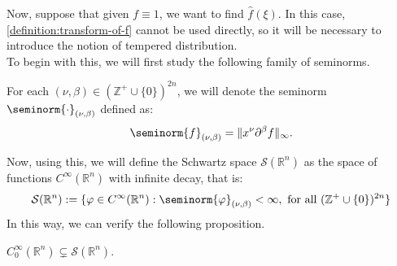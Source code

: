 Now, suppose that given $f \equiv 1$, we want to find $\hat{f}(\xi)$. In this case, \cref{definition:transform-of-f} cannot be used directly, so it will be necessary to introduce the notion of tempered distribution.\\
To begin with this, we will first study the following family of seminorms.
\begin{definition}{}
  For each $(\nu,\beta) \in (\mathbb{Z}^+ \cup \{0\})^{2n}$, we will denote the seminorm $\seminorm{\cdot}_{(\nu,\beta)}$ defined as:
  $$ \seminorm{f}_{(\nu,\beta)} = \|x^\nu \partial^\beta f\|_{\infty}. $$ 
\end{definition}
Now, using this, we will define the Schwartz space $\mathcal{S}(\mathbb{R}^n)$ as the space of functions $C^{\infty}(\mathbb{R}^n)$ with infinite decay, that is:
\begin{align*}
  \mathcal{S}(\mathbb{R}^n) := \{\varphi \in C^{\infty}(\mathbb{R}^n): \seminorm{\varphi}_{(\nu,\beta)} < \infty, \text{ for all } (\mathbb{Z}^+ \cup \{0\})^{2n}\}
\end{align*} 
In this way, we can verify the following proposition. 
\begin{proposition}{}
  $C^{\infty}_{0}(\mathbb{R}^n) \subsetneq \mathcal{S}(\mathbb{R}^n)$.
\end{proposition}
